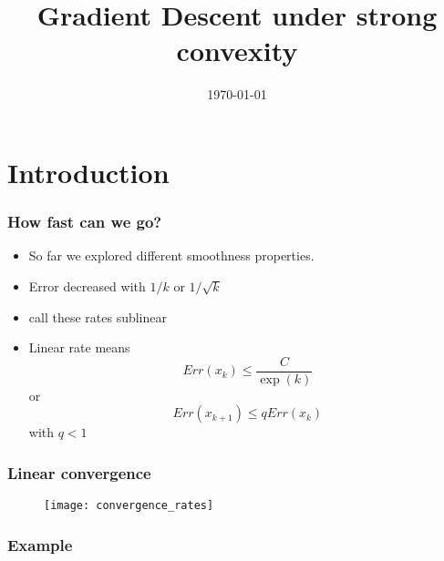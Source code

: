 \documentclass{beamer}
\title{Gradient Descent under strong convexity}
\date{\today}
\begin{document}
\maketitle
\frame{\tableofcontents}

\section{Introduction}%

\begin{frame}
  \frametitle{How fast can we go?}

  \begin{itemize}
    \item So far we explored different smoothness properties.
    \item Error decreased with $1/k$ or $1/\sqrt{k}$
    \item call these rates sublinear
    \item Linear rate means
          \begin{equation}
            Err(x_{k}) \le \frac{C}{\exp(k)}
          \end{equation}
          or
          \begin{equation}
            Err(x_{k+1}) \le q Err(x_k)
          \end{equation}
          with $q<1$
  \end{itemize}
\end{frame}


\begin{frame}
  \frametitle{Linear convergence}
  \begin{figure}[ht]
    \centering
    \texttt{[image: convergence\_rates]}
  \end{figure}
\end{frame}


\begin{frame}
  \frametitle{Example}

\end{frame}
\end{document}
